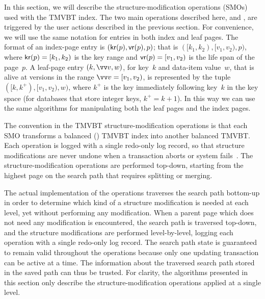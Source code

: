 In this section, we will describe the structure-modification operations
(SMOs) used with the TMVBT index. 
The two main operations described here,  and
, are triggered by the user actions described in the previous
section. 
For convenience, we will use the same notation for entries in both index
and leaf pages.
The format of an index-page entry is $(\text{\textsf{kr}}(p), \text{\textsf{vr}}(p), p)$; that is
$([k_1, k_2), [v_1, v_2), p)$, where $\text{\textsf{kr}}(p) = [k_1, k_2)$ is the key range
and $\text{\textsf{vr}}(p) = [v_1, v_2)$ is the life span of the page~$p$. 
A leaf-page entry $(k,\vrmark{v},w)$, for key~$k$ and data-item
value~$w$, that is alive at versions in the range $\vrmark{v} = [v_1,
v_2)$, is represented by the tuple $([k, k^{+}), [v_1, v_2), w)$,
where $k^{+}$ is the key immediately following key~$k$ in the key space (for
databases that store integer keys, $k^{+} = k + 1$).
In this way we can use the same algorithms for manipulating both the leaf
pages and the index pages.

The convention in the TMVBT structure-modification operations is
that each SMO transforms a balanced () TMVBT
index into another balanced TMVBT\@.
Each operation is logged with a single redo-only log record, so that
structure modifications are never undone when a transaction aborts or
system fails~\cite{jaluta:2005:blink,jaluta:2006:page-server}. 
The structure-modification operations are performed top-down,
starting from the highest page on the search path that requires
splitting or merging.

The actual implementation of the operations traverses the search path
bottom-up in order to determine which kind of a structure modification
is needed at each level, yet without performing any modification. 
When a parent page which does not need any modification is encountered, the
search path is traversed top-down, and the structure modifications are
performed level-by-level, logging each operation with a single redo-only log
record.
The search path state is guaranteed to remain valid throughout the
operations because only one updating transaction can be active at a
time.
The information about the traversed search path stored in the
saved path can thus be trusted.
For clarity, the algorithms presented in this section only describe
the structure-modification operations applied at a single level.

